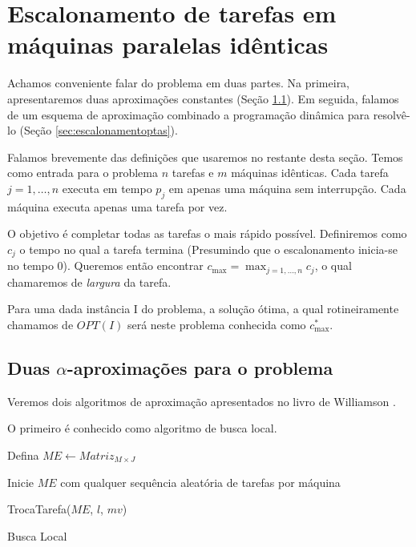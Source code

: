 \section{Escalonamento de tarefas em máquinas paralelas idênticas}
\label{sec:escalonamento}

Achamos conveniente falar do problema em duas partes. Na primeira, apresentaremos duas aproximações constantes (Seção \ref{sec:escalonamentocte}). Em seguida, falamos de um esquema de aproximação combinado a programação dinâmica para resolvê-lo (Seção \ref{sec:escalonamentoptas}).

Falamos brevemente das definições que usaremos no restante desta seção. Temos como entrada para o problema $n$ tarefas e $m$ máquinas idênticas. Cada tarefa $j = 1, \ldots, n$ executa em tempo $p_j$ em apenas uma máquina sem interrupção. Cada máquina executa apenas uma tarefa por vez. 

O objetivo é completar todas as tarefas o mais rápido possível. Definiremos como $c_j$ o tempo no qual a tarefa termina (Presumindo que o escalonamento inicia-se no tempo 0). Queremos então encontrar $c_{\max} = \max_{j = 1, \ldots, n} c_j$, o qual chamaremos de \textit{largura} da tarefa.

Para uma dada instância I do problema, a solução ótima, a qual rotineiramente chamamos de $OPT(I)$ será neste problema conhecida como $c_{\max}^*$.

\subsection{Duas $\alpha$-aproximações para o problema}
\label{sec:escalonamentocte}

Veremos dois algoritmos de aproximação apresentados no livro de Williamson \cite{Williamson}.

O primeiro é conhecido como algoritmo de busca local.

\begin{algorithm}[H]
\SetAlgoLined
{}

Defina $ME \leftarrow Matriz_{M \times J}$

Inicie $ME$ com qualquer sequência aleatória de tarefas por máquina

 { TrocaTarefa($ME$, $l$, $mv$)  }

\caption{Busca Local}
\label{alg:buscalocalescalonamento}
\end{algorithm}

